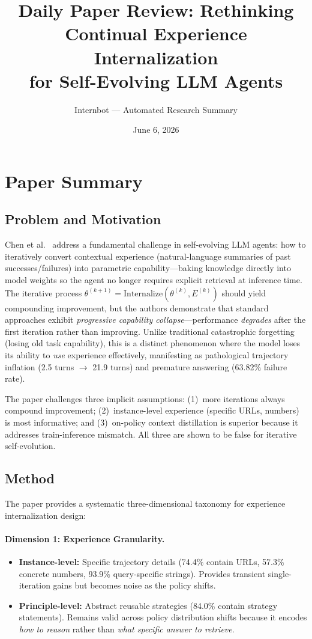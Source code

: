 \documentclass[11pt,a4paper]{article}
\title{Daily Paper Review: Rethinking Continual Experience Internalization\\for Self-Evolving LLM Agents}
\author{Internbot --- Automated Research Summary}
\date{June 6, 2026}
\begin{document}
\maketitle

\section{Paper Summary}

\subsection{Problem and Motivation}

Chen et al.~\cite{chen2026rethinking} address a fundamental challenge in self-evolving LLM agents: how to iteratively convert contextual experience (natural-language summaries of past successes/failures) into parametric capability---baking knowledge directly into model weights so the agent no longer requires explicit retrieval at inference time. The iterative process $\theta^{(k+1)} = \mathrm{Internalize}(\theta^{(k)}, E^{(k)})$ should yield compounding improvement, but the authors demonstrate that standard approaches exhibit \emph{progressive capability collapse}---performance \emph{degrades} after the first iteration rather than improving. Unlike traditional catastrophic forgetting (losing old task capability), this is a distinct phenomenon where the model loses its ability to \emph{use} experience effectively, manifesting as pathological trajectory inflation (2.5 turns $\to$ 21.9 turns) and premature answering (63.82\% failure rate).

The paper challenges three implicit assumptions: (1)~more iterations always compound improvement; (2)~instance-level experience (specific URLs, numbers) is most informative; and (3)~on-policy context distillation is superior because it addresses train-inference mismatch. All three are shown to be false for iterative self-evolution.

\subsection{Method}

The paper provides a systematic three-dimensional taxonomy for experience internalization design:

\paragraph{Dimension 1: Experience Granularity.}
\begin{itemize}
\item \textbf{Instance-level:} Specific trajectory details (74.4\% contain URLs, 57.3\% concrete numbers, 93.9\% query-specific strings). Provides transient single-iteration gains but becomes noise as the policy shifts.
\item \textbf{Principle-level:} Abstract reusable strategies (84.0\% contain strategy statements). Remains valid across policy distribution shifts because it encodes \emph{how to reason} rather than \emph{what specific answer to retrieve}.
\end{itemize}
\end{document}
